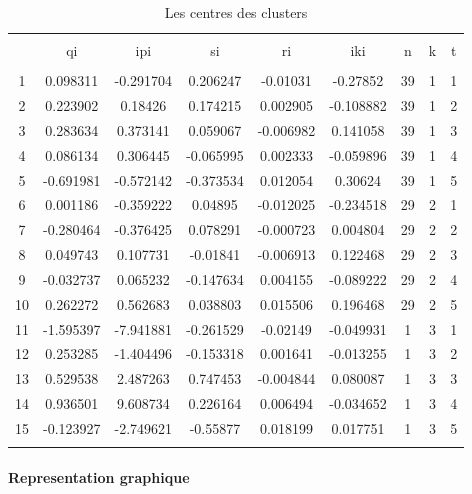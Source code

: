 \documentclass[11pt,]{article}
\let\oldparagraph\paragraph
\renewcommand{\paragraph}[1]{\oldparagraph{#1}\mbox{}}
\begin{document}
\begin{table}[!htbp] \centering 
  \caption{Les centres des clusters} 
  \label{} 
\begin{tabular}{@{\extracolsep{5pt}} ccccccccc} 
\\[-1.8ex]\hline 
\hline \\[-1.8ex] 
 & qi & ipi & si & ri & iki & n & k & t \\ 
\hline \\[-1.8ex] 
1 & 0.098311 & -0.291704 & 0.206247 & -0.01031 & -0.27852 & 39 & 1 & 1 \\ 
2 & 0.223902 & 0.18426 & 0.174215 & 0.002905 & -0.108882 & 39 & 1 & 2 \\ 
3 & 0.283634 & 0.373141 & 0.059067 & -0.006982 & 0.141058 & 39 & 1 & 3 \\ 
4 & 0.086134 & 0.306445 & -0.065995 & 0.002333 & -0.059896 & 39 & 1 & 4 \\ 
5 & -0.691981 & -0.572142 & -0.373534 & 0.012054 & 0.30624 & 39 & 1 & 5 \\ 
6 & 0.001186 & -0.359222 & 0.04895 & -0.012025 & -0.234518 & 29 & 2 & 1 \\ 
7 & -0.280464 & -0.376425 & 0.078291 & -0.000723 & 0.004804 & 29 & 2 & 2 \\ 
8 & 0.049743 & 0.107731 & -0.01841 & -0.006913 & 0.122468 & 29 & 2 & 3 \\ 
9 & -0.032737 & 0.065232 & -0.147634 & 0.004155 & -0.089222 & 29 & 2 & 4 \\ 
10 & 0.262272 & 0.562683 & 0.038803 & 0.015506 & 0.196468 & 29 & 2 & 5 \\ 
11 & -1.595397 & -7.941881 & -0.261529 & -0.02149 & -0.049931 & 1 & 3 & 1 \\ 
12 & 0.253285 & -1.404496 & -0.153318 & 0.001641 & -0.013255 & 1 & 3 & 2 \\ 
13 & 0.529538 & 2.487263 & 0.747453 & -0.004844 & 0.080087 & 1 & 3 & 3 \\ 
14 & 0.936501 & 9.608734 & 0.226164 & 0.006494 & -0.034652 & 1 & 3 & 4 \\ 
15 & -0.123927 & -2.749621 & -0.55877 & 0.018199 & 0.017751 & 1 & 3 & 5 \\ 
\hline \\[-1.8ex] 
\end{tabular} 
\end{table}

\FloatBarrier

\hypertarget{representation-graphique-1}{%
\paragraph{Representation graphique}\label{representation-graphique-1}}
\end{document}
